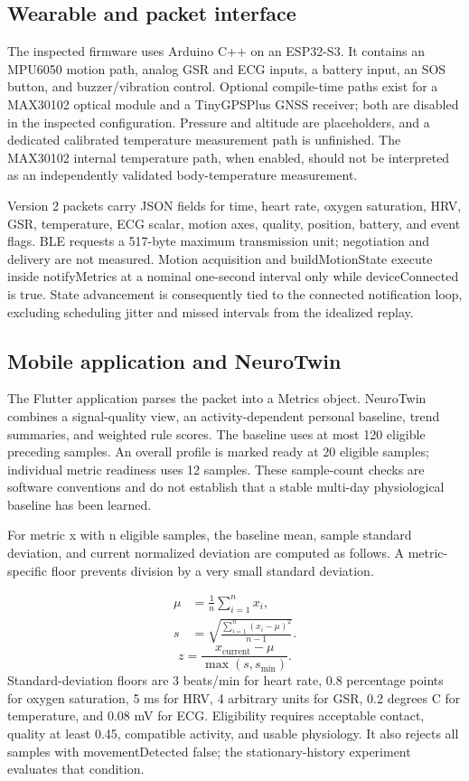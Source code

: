 \documentclass[journal]{IEEEtran}
\begin{document}
\subsection{Wearable and packet interface}
The inspected firmware uses Arduino C++ on an ESP32-S3. It contains an MPU6050 motion path, analog GSR and ECG inputs, a battery input, an SOS button, and buzzer/vibration control. Optional compile-time paths exist for a MAX30102 optical module and a TinyGPSPlus GNSS receiver; both are disabled in the inspected configuration. Pressure and altitude are placeholders, and a dedicated calibrated temperature measurement path is unfinished. The MAX30102 internal temperature path, when enabled, should not be interpreted as an independently validated body-temperature measurement.

Version 2 packets carry JSON fields for time, heart rate, oxygen saturation, HRV, GSR, temperature, ECG scalar, motion axes, quality, position, battery, and event flags. BLE requests a 517-byte maximum transmission unit; negotiation and delivery are not measured. Motion acquisition and buildMotionState execute inside notifyMetrics at a nominal one-second interval only while deviceConnected is true. State advancement is consequently tied to the connected notification loop, excluding scheduling jitter and missed intervals from the idealized replay.

\subsection{Mobile application and NeuroTwin}
The Flutter application parses the packet into a Metrics object. NeuroTwin combines a signal-quality view, an activity-dependent personal baseline, trend summaries, and weighted rule scores. The baseline uses at most 120 eligible preceding samples. An overall profile is marked ready at 20 eligible samples; individual metric readiness uses 12 samples. These sample-count checks are software conventions and do not establish that a stable multi-day physiological baseline has been learned.

For metric x with n eligible samples, the baseline mean, sample standard deviation, and current normalized deviation are computed as follows. A metric-specific floor prevents division by a very small standard deviation.

\begin{equation}\begin{aligned}\mu&=\frac{1}{n}\sum_{i=1}^{n}x_i,\\s&=\sqrt{\frac{\sum_{i=1}^{n}(x_i-\mu)^2}{n-1}}.\end{aligned}\end{equation}
\begin{equation}z=\frac{x_{\mathrm{current}}-\mu}{\max(s,s_{\min})}.\end{equation}
Standard-deviation floors are 3 beats/min for heart rate, 0.8 percentage points for oxygen saturation, 5 ms for HRV, 4 arbitrary units for GSR, 0.2 degrees C for temperature, and 0.08 mV for ECG. Eligibility requires acceptable contact, quality at least 0.45, compatible activity, and usable physiology. It also rejects all samples with movementDetected false; the stationary-history experiment evaluates that condition.
\end{document}
